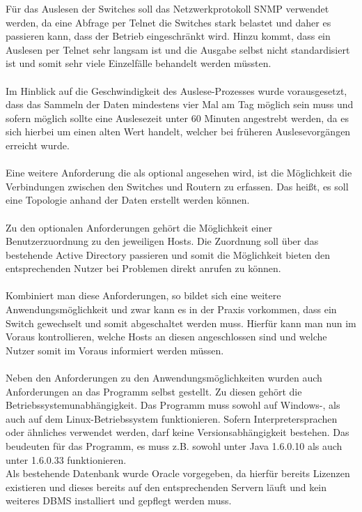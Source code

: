Für das Auslesen der Switches soll das Netzwerkprotokoll SNMP verwendet werden, da eine Abfrage per Telnet die Switches stark belastet und daher es passieren kann, dass der Betrieb eingeschränkt wird. Hinzu kommt, dass ein Auslesen per Telnet sehr langsam ist und die Ausgabe selbst nicht standardisiert ist und somit sehr viele Einzelfälle behandelt werden müssten.\\\\
Im Hinblick auf die Geschwindigkeit des Auslese-Prozesses wurde vorausgesetzt, dass das Sammeln der Daten mindestens vier Mal am Tag möglich sein muss und sofern möglich sollte eine Auslesezeit unter 60 Minuten angestrebt werden, da es sich hierbei um einen alten Wert handelt, welcher bei früheren Auslesevorgängen erreicht wurde.\\\\
Eine weitere Anforderung die als optional angesehen wird, ist die Möglichkeit die Verbindungen zwischen den Switches und Routern zu erfassen. Das heißt, es soll eine Topologie anhand der Daten erstellt werden können.\\\\
Zu den optionalen Anforderungen gehört die Möglichkeit einer Benutzerzuordnung zu den jeweiligen Hosts. Die Zuordnung soll über das bestehende Active Directory passieren und somit die Möglichkeit bieten den entsprechenden Nutzer bei Problemen direkt anrufen zu können.\\\\
Kombiniert man diese Anforderungen, so bildet sich eine weitere Anwendungsmöglichkeit und zwar kann es in der Praxis vorkommen, dass ein Switch gewechselt und somit abgeschaltet werden muss.
Hierfür kann man nun im Voraus kontrollieren, welche Hosts an diesen angeschlossen sind und welche Nutzer somit im Voraus informiert werden müssen.\\\\
Neben den Anforderungen zu den Anwendungsmöglichkeiten wurden auch Anforderungen an das Programm selbst gestellt.
Zu diesen gehört die Betriebssystemunabhängigkeit.
Das Programm muss sowohl auf Windows-, als auch auf dem Linux-Betriebssystem funktionieren. Sofern Interpretersprachen oder ähnliches verwendet werden, darf keine Versionsabhängigkeit bestehen. Das beudeuten für das Programm, es muss z.B. sowohl unter Java 1.6.0.10 als auch unter 1.6.0.33 funktionieren.\\
Als bestehende Datenbank wurde Oracle vorgegeben, da hierfür bereits Lizenzen existieren und dieses bereits auf den entsprechenden Servern läuft und kein weiteres DBMS installiert und gepflegt werden muss.\\

